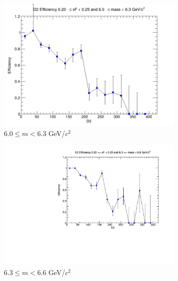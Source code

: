 \begin{figure}[p]
\begin{subfigure}[b]{0.32\textwidth}
        \includegraphics[width=\textwidth]{./kTrackerEfficiencyPlots/D2_Efficiency_xF4_mass6.png}
        \caption{$6.0 \leq m < 6.3$ GeV/$c^2$}
        \label{fig:xF4_mass6}
    \end{subfigure}
    \hfill
    \begin{subfigure}[b]{0.32\textwidth}
        \centering
        \includegraphics[width=\textwidth]{./kTrackerEfficiencyPlots/D2_Efficiency_xF4_mass7.pdf}
        \caption{$6.3 \leq m < 6.6$ GeV/$c^2$}
        \label{fig:xF4_mass7}
    \end{subfigure}
    \hfill
    \begin{subfigure}[b]{0.32\textwidth}
        \centering

\end{subfigure}
\end{figure}
